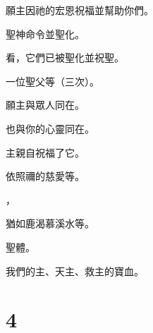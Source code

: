 願主因祂的宏恩祝福並幫助你們。\par

\par

\par

\par

聖神命令並聖化。\par

\par

看，它們已被聖化並祝聖。\par

\par

一位聖父等（三次）。\par

\par

願主與眾人同在。\par

\par

也與你的心靈同在。\par

\par

主親自祝福了它。\par

\par

依照禰的慈愛等。\par

，\par

猶如鹿渴慕溪水等。\par

\par

聖體。\par

\par

我們的主、天主、救主的寶血。\par


\section{4}

